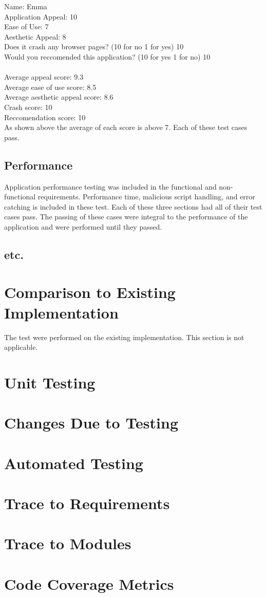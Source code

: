 \documentclass[12pt, titlepage]{article}
\begin{document}
Name: Emma\\
Application Appeal: 10 \\ 
Ease of Use: 7\\ 
Aesthetic Appeal: 8\\ 
Does it crash any browser pages? (10 for no 1 for yes) 10\\ 
Would you reccomended this application? (10 for yes 1 for no) 10\\ 
\\
Average appeal score:  9.3
\\
Average ease of use score: 8.5
\\
Average aesthetic appeal score: 8.6
\\
Crash score: 10
\\
Reccomendation score: 10
\\
As shown above the average of each score is above 7. Each of these test cases pass.
\subsection{Performance}
Application performance testing was included in the functional and non-functional requirements. Performance time, malicious script handling, and error catching is included in these test. Each of these three sections had all of their test cases pass. The passing of these cases were integral to the performance of the application and were performed until they passed. 
\subsection{etc.}
	
\section{Comparison to Existing Implementation}	
The test were performed on the existing implementation. This section is not applicable.
\section{Unit Testing}
\section{Changes Due to Testing}
\section{Automated Testing}
		
\section{Trace to Requirements}
		
\section{Trace to Modules}
		
\section{Code Coverage Metrics}
\end{document}

